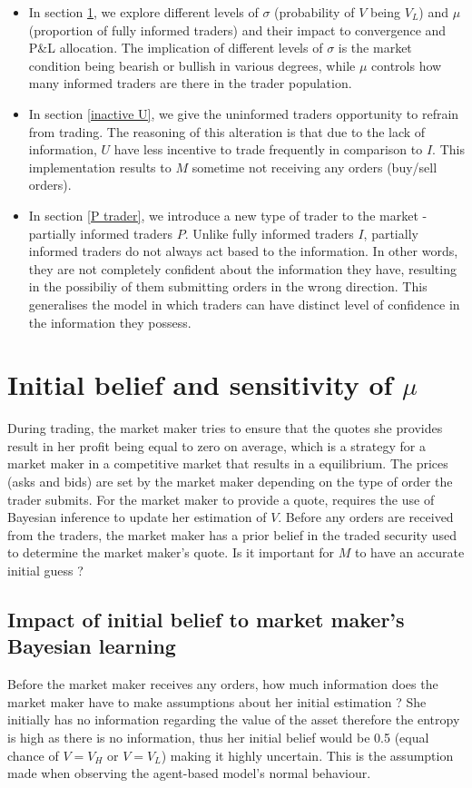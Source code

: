 \documentclass{article}
\begin{document}
\begin{itemize}
    \item In section \ref{sigma and mu}, we explore different levels of $\sigma$ (probability of $V$ being $V_L$) and $\mu$ (proportion of fully informed traders) and their impact to convergence and P\&L allocation. The implication of different levels of $\sigma$ is the market condition being bearish or bullish in various degrees, while $\mu$ controls how many informed traders are there in the trader population.
    \item In section \ref{inactive U}, we give the uninformed traders opportunity to refrain from trading. The reasoning of this alteration is that due to the lack of information, $U$ have less incentive to trade frequently in comparison to $I$. This implementation results to $M$ sometime not receiving any orders (buy/sell orders).
    \item In section \ref{P trader}, we introduce a new type of trader to the market - partially informed traders $P$. Unlike fully informed traders $I$, partially informed traders do not always act based to the information. In other words, they are not completely confident about the information they have, resulting in the possibiliy of them submitting orders in the wrong direction. This generalises the model in which traders can have distinct level of confidence in the information they possess.
\end{itemize}

\section{Initial belief and sensitivity of $\mu$}\label{sigma and mu}
During trading, the market maker tries to ensure that the quotes she provides result in her profit being equal to zero on average, which is a strategy for a market maker in a competitive market that results in a equilibrium. The prices (asks and bids) are set by the market maker depending on the type of order the trader submits. For the market maker to provide a quote, requires the use of Bayesian inference to update her estimation of $V$. Before any orders are received from the traders, the market maker has a prior belief in the traded security used to determine the market maker's quote. Is it important for $M$ to have an accurate initial guess ? 

\subsection{Impact of initial belief to market maker's Bayesian learning}
Before the market maker receives any orders, how much information does the market maker have to make assumptions about her initial estimation ? She initially has no information regarding the value of the asset therefore the entropy is high as there is no information, thus her initial belief would be 0.5 (equal chance of $V=V_H$ or $V=V_L$) making it highly uncertain. This is the assumption made when observing the agent-based model's normal behaviour.
\end{document}
